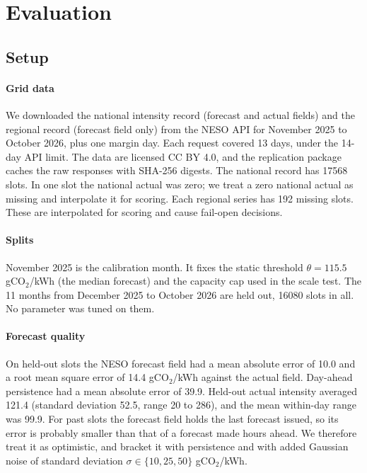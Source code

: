 \documentclass[journal]{IEEEtran}
\begin{document}
\section{Evaluation}
\label{sec:eval}

\subsection{Setup}
\paragraph{Grid data} We downloaded the national intensity record (forecast and actual fields) and the regional record (forecast field only) from the NESO API \cite{nesoapi} for November 2025 to October 2026, plus one margin day. Each request covered 13 days, under the 14-day API limit. The data are licensed CC BY 4.0, and the replication package caches the raw responses with SHA-256 digests. The national record has 17568 slots. In one slot the national actual was zero; we treat a zero national actual as missing and interpolate it for scoring. Each regional series has 192 missing slots. These are interpolated for scoring and cause fail-open decisions.

\paragraph{Splits} November 2025 is the calibration month. It fixes the static threshold $\theta = 115.5$ gCO$_2$/kWh (the median forecast) and the capacity cap used in the scale test. The 11 months from December 2025 to October 2026 are held out, 16080 slots in all. No parameter was tuned on them.

\paragraph{Forecast quality} On held-out slots the NESO forecast field had a mean absolute error of 10.0 and a root mean square error of 14.4 gCO$_2$/kWh against the actual field. Day-ahead persistence had a mean absolute error of 39.9. Held-out actual intensity averaged 121.4 (standard deviation 52.5, range 20 to 286), and the mean within-day range was 99.9. For past slots the forecast field holds the last forecast issued, so its error is probably smaller than that of a forecast made hours ahead. We therefore treat it as optimistic, and bracket it with persistence and with added Gaussian noise of standard deviation $\sigma \in \{10, 25, 50\}$ gCO$_2$/kWh.
\end{document}
